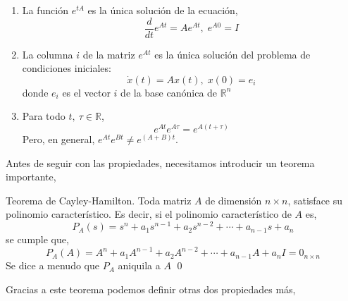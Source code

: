 \begin{enumerate}
\item La función $e^{tA}$ es la única solución de la ecuación,
\begin{equation*}
\frac{d}{dt}e^{At} =Ae^{At}, \; e^{A0}=I
\end{equation*}

\item La columna $i$ de la matriz $e^{At}$ es la única solución del problema de condiciones iniciales:
\begin{equation*}
	\dot x(t) = Ax(t), \; x(0) = e_i
\end{equation*}
donde $e_i$ es el vector $i$ de la base canónica de $\mathbb{R}^n$

\item Para todo $t,\ \tau \in \mathbb{R}$,
\begin{equation*}
e^{At}e^{A\tau} = e^{A(t+\tau)}
\end{equation*}
Pero, en general, $e^{At}e^{Bt} \neq e^{(A+B)t}$.
\end{enumerate}

Antes de seguir con las propiedades, necesitamos introducir un teorema importante,
\begin{theorem}{Teorema de Cayley-Hamilton.}
Toda matriz $A$ de dimensión $n\times n$, satisface su polinomio característico.
Es decir, si el polinomio característico de $A$ es,
\begin{equation*}
P_A(s) = s^n + a_1s^{n-1}+a_2s^{n-2}+ \cdots + a_{n-1}s + a_n
\end{equation*}
se cumple que,
\begin{equation}\label{eq:ch}
P_A(A) = A^n + a_1A^{n-1}+a_2A^{n-2}+ \cdots + a_{n-1}A + a_nI  = 0_{n\times n}
\end{equation}
Se dice a menudo que $P_A$ aniquila a $A$
\qed
\end{theorem}

Gracias a este teorema podemos definir otras dos propiedades más,

